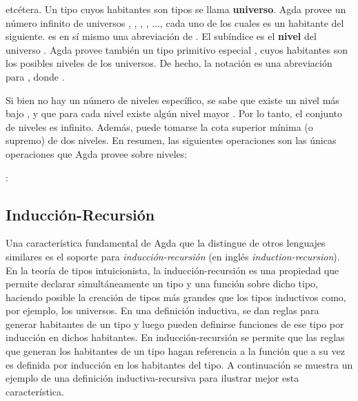  \AgdaSymbol{:}  

 \AgdaSymbol{:} 

etcétera. Un tipo cuyos habitantes son tipos se llama \textbf{universo}. Agda provee un número infinito de universos , , , , ..., cada uno de los cuales es un habitante del siguiente.  es en sí mismo una abreviación de . El subíndice  es el \textbf{nivel} del universo . Agda provee también un tipo primitivo especial , cuyos habitantes son los posibles niveles de los universos. De hecho, la notación  es una abreviación para , donde  \AgdaSymbol{:} . 

Si bien no hay un número de niveles específico, se sabe que existe un nivel más bajo , y que para cada nivel  existe algún nivel mayor  . Por lo tanto, el conjunto de niveles es infinito. Además, puede tomarse la cota superior mínima (o supremo)  de dos niveles. En resumen, las siguientes operaciones son las únicas operaciones que Agda provee sobre niveles:

 \AgdaSymbol{:} 

 \AgdaSymbol{:} \AgdaSymbol{(} : \AgdaSymbol{)} \AgdaSymbol{$\rightarrow$}  

\AgdaFunction{$\_\sqcup\_$} \AgdaSymbol{:} \AgdaSymbol{(} \AgdaSymbol{:} \AgdaSymbol{)} \AgdaSymbol{$\rightarrow$} 


\subsection{Inducción-Recursión}\label{additional:ind-rec}

Una característica fundamental de Agda que la distingue de otros lenguajes similares es el soporte para \textit{inducción-recursión} (en inglés \textit{induction-recursion}). En la teoría de tipos intuicionista, la inducción-recursión es una propiedad que permite declarar simultáneamente un tipo y una función sobre dicho tipo, haciendo posible la creación de tipos más grandes que los tipos inductivos como, por ejemplo, los universos. En una definición inductiva, se dan reglas para generar habitantes de un tipo y luego pueden definirse funciones de ese tipo por inducción en dichos habitantes. En inducción-recursión se permite que las reglas que generan los habitantes de un tipo hagan referencia a la función que a su vez es definida por inducción en los habitantes del tipo. A continuación se muestra un ejemplo de una definición inductiva-recursiva para ilustrar mejor esta característica. 

